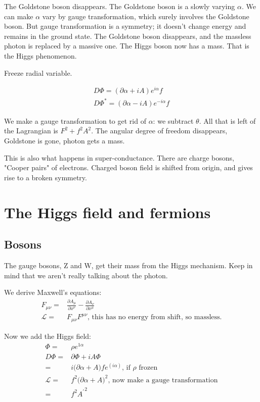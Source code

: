 \documentclass[]{article}
\begin{document}
The Goldstone boson disappears. The Goldstone boson is a slowly varying $\alpha$. We can make $\alpha$ vary by gauge transformation, which surely involves the Goldstone boson. But gauge transformation is a symmetry; it doesn't change energy and remains in the ground state. The Goldstone boson disappears, and the massless photon is replaced by a massive one. The Higgs boson now has a mass. That is the Higgs phenomenon.


Freeze radial variable.

\begin{align*}
	D \Phi = (\partial \alpha + iA)e^{i\alpha}f\\
	D \Phi^* = (\partial \alpha - iA)e^{-i\alpha}f
\end{align*}

We make a gauge transformation to get rid of $\alpha$: we subtract $\theta$. All that is left of the Lagrangian is $F^2+f^2A^2$. The angular degree of freedom disappears, Goldstone is gone, photon gets a mass.

This is also what happens in super-conductance. There are charge bosons, "Cooper pairs" of electrons. Charged boson field is shifted from origin, and gives rise to a broken symmetry.


\section{The Higgs field and fermions}

\subsection{Bosons}

The gauge bosons, Z and W, get their mass from the Higgs mechanism. Keep in mind that we aren't really talking about the photon.

We derive Maxwell's equations:
\begin{align*}
	F_{\mu\nu}=&\frac{\partial A_\mu}{\partial x^\nu}-\frac{\partial A_\nu}{\partial x^\mu}\\
	\mathcal{L} =& F_{\mu\nu} F^{\mu\nu} \text{, this has no energy from shift, so massless.}
\end{align*}

Now we add the Higgs field:
\begin{align*}
	\Phi =& \rho e^{1 \alpha}\\
	D \Phi =& \partial \Phi + i A \Phi\\
	=& i \big( \partial \alpha + A \big) f e^(i \alpha) \text{, if $\rho$ frozen}\\
	\mathcal{L} =& f^2 \big(\partial \alpha + A \big)^2 \text{, now make a gauge transformation}\\
	=& f^2 {A^\prime}^2
\end{align*}
\end{document}
